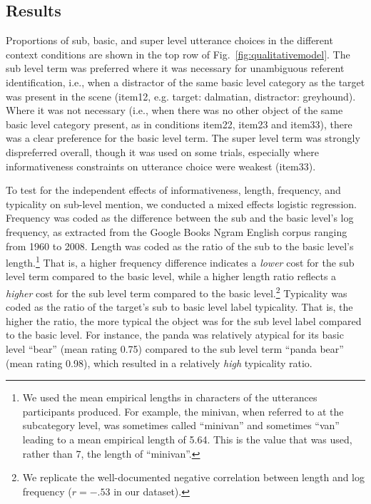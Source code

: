 \documentclass[10pt,letterpaper]{article}
\newcommand{\figref}[1]{Fig.~\ref{#1}}
\begin{document}
\subsection{\bf Results}

Proportions of sub, basic, and super level utterance choices in the different context conditions are shown in the top row of \figref{fig:qualitativemodel}. The sub level term was preferred where it was necessary for unambiguous referent identification, i.e., when a distractor of the same basic level category as the target was present in the scene (item12, e.g. target: dalmatian, distractor: greyhound). Where it was not necessary (i.e., when there was no other object of the same basic level category present, as in conditions item22, item23 and item33), there was a clear preference for the basic level term. The super level term was strongly dispreferred overall, though it was used on some trials, especially where informativeness constraints on utterance choice were weakest (item33). 
%

To test for the independent effects of informativeness, length, frequency, and typicality on sub-level mention, we conducted a mixed effects logistic regression. Frequency was coded as the difference between the sub and the basic level's log frequency, as extracted from the Google Books Ngram English corpus ranging from 1960 to 2008. Length was coded as the ratio of the sub to the basic level's length.\footnote{We used the mean empirical lengths in characters of the utterances participants produced. For example, the minivan, when referred to at the subcategory level, was sometimes called ``minivan'' and sometimes ``van'' leading to a mean empirical length of 5.64. This is the value that was used, rather than 7, the length of ``minivan''.} That is, a higher frequency difference indicates a \emph{lower} cost for the sub level term compared to the basic level, while a higher length ratio reflects a \emph{higher} cost for the sub level term compared to the basic level.\footnote{We replicate the well-documented negative correlation between length and log frequency ($r = -.53$ in our dataset).} Typicality was coded as the ratio of the target's sub to basic level label typicality. That is, the higher the ratio, the more typical the object was for the sub level label compared to the basic level.
For instance, the panda was relatively atypical for its basic level ``bear'' (mean rating 0.75) compared to the sub level term ``panda bear'' (mean rating 0.98), which resulted in a relatively \emph{high} typicality ratio.
\end{document}
